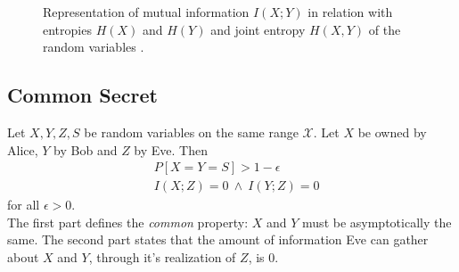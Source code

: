	\begin{figure}[h]
		\centering
		
		\caption{Representation of mutual information $I(X;Y)$ in relation with entropies $H(X)$ and $H(Y)$ and joint entropy $H(X,Y)$ of the random variables .
		\label{fig:mutual_info}}
	\end{figure}		
	
	\subsection{Common Secret} \label{commonsecret}%
	Let $X,Y,Z,S$ be random variables on the same range $\mathcal{X}$. Let $X$ be owned by Alice, $Y$ by Bob and $Z$ by Eve. Then
  \begin{align}
	 & P[X=Y=S] > 1 - \epsilon\label{eqn:common}\tag{common} \\ 
	 & I(X;Z) = 0 \: \wedge \: I(Y;Z) = 0 \label{eqn:secret}\tag{secret}
  \end{align}
for all $\epsilon > 0 $. \\
The first part defines the \textit{common} property: $X$ and $Y$ must be asymptotically the same. 
The second part states that the amount of information Eve can gather about $X$ and $Y$, through it's realization of $Z$, is $0$.
